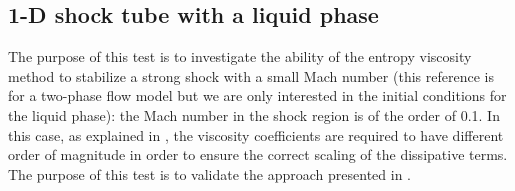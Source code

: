 \subsection{1-D shock tube with a liquid phase} \label{sec:liquid_shock}
The purpose of this test is to investigate the ability of the entropy viscosity method to stabilize a strong shock with a small Mach number \cite{abgrall} (this reference is for a two-phase flow model but we are only interested in the initial conditions for the liquid phase): the Mach number in the shock region is of the order of 0.1. In this case, as explained in , the viscosity coefficients are required to have different order of magnitude in order to ensure the correct scaling of the dissipative terms. The purpose of this test is to validate the approach presented in . 

